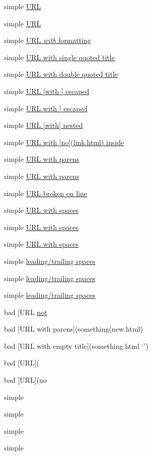 simple \href{}{URL}

simple \href{something.html}{URL}

simple \href{something.html}{URL \emph{with} formatting}

simple \href{something.html}{URL with single quoted title}

simple \href{something.html}{URL with double quoted title}

simple \href{something.html}{URL [with ] escaped}

simple \href{something.html}{URL with ] escaped}

simple \href{something.html}{URL [with] nested}

simple \href{something.html}{URL with [no](link.html) inside}

simple \href{/something/to(do)}{URL with parens}

simple \href{/something/to(do}{URL with parens}

simple \href{something.html}{URL broken
on line}

simple \href{with spaces.html}{URL with spaces}

simple \href{with spaces.html}{URL with spaces}

simple \href{with (spaces).html}{URL with spaces}

simple \href{spaces.html}{leading/trailing spaces}

simple \href{spaces.html}{leading/trailing spaces}

simple \href{spaces.html}{leading/trailing spaces}

bad [URL \href{something.html}{not}

bad [URL with parens](something(new.html)

bad [URL with empty title](something.html `{}')

bad [URL](

bad [URL](no

simple 

simple 

simple 

simple 

